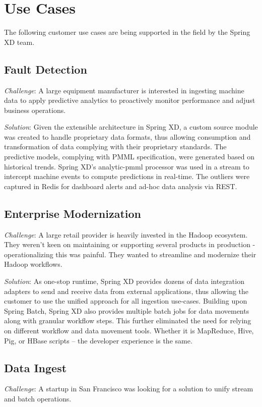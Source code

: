 \section{Use Cases}
\label{sec:Use Cases}

The following customer use cases are being supported in the field by the
Spring XD team.

\subsection{Fault Detection}
\textit{Challenge}: A large equipment manufacturer is interested in
ingesting machine data to apply predictive analytics to proactively monitor
performance and adjust business operations.

\textit{Solution}: Given the extensible architecture in Spring XD, a custom
source module was created to handle proprietary data formats, thus allowing
consumption and transformation of data complying with their proprietary
standards. The predictive models, complying with PMML specification, were
generated based on historical trends. Spring XD's analytic-pmml processor was
used in a stream to intercept machine events to compute predictions in
real-time. The outliers were captured in Redis\cite{redis} for dashboard alerts 
and ad-hoc data analysis via REST.

\subsection{Enterprise Modernization}
\textit{Challenge}: A large retail provider is heavily invested in the Hadoop
\cite{hadoop}
ecosystem. They weren't keen on maintaining or supporting several products in
production - operationalizing this was painful. They wanted to streamline and
modernize their Hadoop workflows.

\textit{Solution}: As one-stop runtime, Spring XD provides dozens of data
integration adapters to send and receive data from external applications, thus
allowing the customer to use the unified approach for all ingestion use-cases.
Building upon Spring Batch, Spring XD also provides multiple batch jobs for data
movements along with granular workflow steps. This further eliminated the need
for relying on different workflow and data movement tools. Whether it is 
MapReduce, Hive, Pig, or HBase scripts -- the developer experience is the same.

\subsection{Data Ingest}
\textit{Challenge}: A startup in San Francisco was looking for a solution to
unify stream and batch operations. 

